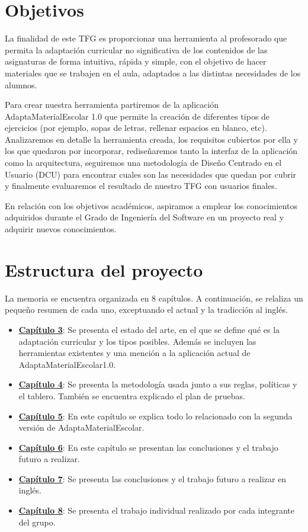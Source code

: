 \section{Objetivos}\label{cap:objetivos}
La finalidad de este TFG es proporcionar una herramienta al profesorado que permita la adaptación curricular no significativa de los contenidos de las asignaturas de forma intuitiva, rápida y simple, con el objetivo de hacer materiales que se trabajen en el aula, adaptados a las distintas necesidades de los alumnos.

Para crear nuestra herramienta partiremos de la aplicación AdaptaMaterialEscolar 1.0  que permite la creación de diferentes tipos de ejercicios (por ejemplo, sopas de letras, rellenar espacios en blanco, etc). Analizaremos en detalle la herramienta creada, los requisitos cubiertos por ella y los que quedaron por incorporar, rediseñaremos tanto la interfaz de la aplicación como la arquitectura, seguiremos una metodología de Diseño Centrado en el Usuario (DCU) para encontrar cuales son las necesidades que quedan por cubrir y finalmente evaluaremos el resultado de nuestro TFG con usuarios finales.
 
En relación con los objetivos académicos, aspiramos a emplear los conocimientos adquiridos durante el Grado de Ingeniería del Software en un proyecto real y adquirir nuevos conocimientos.



\section{Estructura del proyecto}\label{cap:estructura}
La memoria se encuentra organizada en 8 capítulos. A continuación, se relaliza un pequeño resumen de cada uno, exceptuando el actual y la tradicción al inglés.
\begin{itemize}
    \item \textbf{\hyperref[cap:estadoDelArte]{Capítulo 3}}: Se presenta el estado del arte, en el que se define qué es la adaptación curricular y los tipos posibles. Además se incluyen las herramientas existentes y una mención a la aplicación actual de  AdaptaMaterialEscolar1.0.
    \item \textbf{\hyperref[cap:metodologia]{Capítulo 4}}: Se presenta la metodología usada junto a sus reglas, políticas y el tablero. También se encuentra explicado el plan de pruebas.
    \item \textbf{\hyperref[cap:AdaptaMaterialEscolar2.0]{Capítulo 5}}: En este capítulo se explica todo lo relacionado con la segunda versión de AdaptaMaterialEscolar.
    \item \textbf{\hyperref[cap:conclusiones]{Capítulo 6}}: En este capítulo se presentan las conclusiones y el trabajo futuro a realizar.
    \item \textbf{\hyperref[cap:conclusions]{Capítulo 7}}: Se presenta las conclusiones y el trabajo futuro a realizar en inglés.
    \item \textbf{\hyperref[cap:TrabajoIndividual]{Capítulo 8}}: Se presenta el trabajo individual realizado por cada integrante del grupo.
\end{itemize}